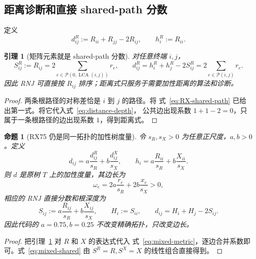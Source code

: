 \documentclass[UTF8,11pt]{ctexart}
\newtheorem{lemma}[definition]{引理}
\newtheorem{proposition}[definition]{命题}
\newcommand{\pathset}{\mathcal P}
\newcommand{\lca}{\operatorname{LCA}}
\begin{document}
\subsection{距离诊断和直接 shared-path 分数}

定义
\begin{equation}
 d^R_{ij}:=R_{ii}+R_{jj}-2R_{ij},
 \qquad h^R_i:=R_{ii}.
 \label{eq:distance-depth}
\end{equation}

\begin{lemma}[矩阵元素就是 shared-path 分数]
\label{lem:additive-distance}
对任意终端 $i,j$，
\begin{equation}
 S^R_{ij}:=R_{ij}=2\sum_{e\in\pathset(0,\lca(i,j))}r_e,
 \qquad
 d^R_{ij}=h^R_i+h^R_j-2S^R_{ij}
 =2\sum_{e\in\pathset(i,j)}r_e.
 \label{eq:direct-R-shared}
\end{equation}
因此 RNJ 可直接按 $R_{ij}$ 排序；距离式只服务于需要加性距离的算法和诊断。
\end{lemma}

\begin{proof}
两条根路径的对称差恰是 $i$ 到 $j$ 的路径。将
式~\eqref{eq:RX-shared-path} 已给出第一式。将它代入式~\eqref{eq:distance-depth}，
公共边出现系数 $1+1-2=0$，只属于一条根路径的边出现系数 $1$，得到距离式。
\end{proof}

\begin{proposition}[RX75 仍是同一拓扑的加性树度量]
\label{prop:rx-mixture}
令 $s_R,s_X>0$ 为任意正尺度，$a,b>0$。定义
\begin{equation}
 d_{ij}=a\frac{d^R_{ij}}{s_R}+b\frac{d^X_{ij}}{s_X},
 \qquad
 h_i=a\frac{R_{ii}}{s_R}+b\frac{X_{ii}}{s_X}.
 \label{eq:mixed-metric}
\end{equation}
则 $d$ 是原树 $T$ 上的加性度量，其边长为
\begin{equation}
 \omega_e=2a\frac{r_e}{s_R}+2b\frac{x_e}{s_X}>0,
\end{equation}
相应的 RNJ 直接分数和根深度为
\begin{equation}
 S_{ij}:=a\frac{R_{ij}}{s_R}+b\frac{X_{ij}}{s_X},
 \qquad H_i:=S_{ii},
 \qquad d_{ij}=H_i+H_j-2S_{ij}.
 \label{eq:mixed-shared}
\end{equation}
因此代码的 $a=0.75,b=0.25$ 不改变精确拓扑，只改变边长。
\end{proposition}

\begin{proof}
把引理~\ref{lem:additive-distance} 对 $R$ 和 $X$ 的表达式代入
式~\eqref{eq:mixed-metric}，逐边合并系数即可。式~\eqref{eq:mixed-shared}
由 $S^R=R,S^X=X$ 的线性组合直接得到。
\end{proof}
\end{document}
